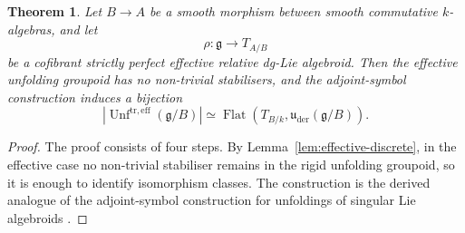 \documentclass[11pt,reqno,a4paper,dvipsnames,x11names]{amsart}
\numberwithin{equation}{section}
\theoremstyle{plain}
\newtheorem{theorem}{Theorem}[section]
\theoremstyle{definition}
\theoremstyle{remark}
\DeclareMathOperator{\Unf}{Unf}
\DeclareMathOperator{\Flat}{Flat}
\newcommand{\kk}{k}
\newcommand{\g}{\mathfrak g}
\newcommand{\uuder}{\mathfrak u_{\mathrm{der}}}
\newcommand{\tr}{\mathrm{tr}}
\newcommand{\eff}{\mathrm{eff}}
\newcommand{\from}{\colon}
\begin{document}
\begin{theorem}\label{thm:strict-affine}
Let \(B\to A\) be a smooth morphism between smooth commutative \(\kk\)-algebras, and let
\[
 \rho\from\g\longrightarrow T_{A/B}
\]
be a cofibrant strictly perfect effective relative dg-Lie algebroid. Then the effective unfolding groupoid has no non-trivial stabilisers, and the adjoint-symbol construction induces a bijection
\[
 \left|\Unf^{\tr,\eff}(\g/B)\right|
 \simeq
 \Flat(T_{B/\kk},\uuder(\g/B)).
\]
\end{theorem}

\begin{proof}
The proof consists of four steps. By Lemma~\ref{lem:effective-discrete}, in the effective case no non-trivial stabiliser remains in the rigid unfolding groupoid, so it is enough to identify isomorphism classes. The construction is the derived analogue of the adjoint-symbol construction for unfoldings of singular Lie algebroids \cite{CMQ}.


\end{proof}
\end{document}
